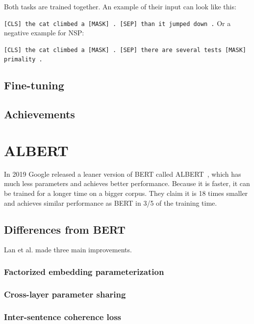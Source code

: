 \documentclass[
  digital, %
  table,   %
  twoside, %
  lof,     %
  lot,     %
]{fithesis3}
\begin{document}
\subsubsection{}

Both tasks are trained together. An example of their input can look like this:

\texttt{[CLS] the cat climbed a [MASK] . [SEP] than it jumped \newline down .}
\newline
Or a negative example for NSP:

\texttt{[CLS] the cat climbed a [MASK] . [SEP] there are several tests [MASK] primality .}


\subsection{Fine-tuning}

\subsection{Achievements}

\section{ALBERT}
In 2019 Google released a leaner version of BERT called ALBERT~\parencite{albert}, which has much less parameters and achieves better performance. Because it is faster, it can be trained for a longer time on a bigger corpus. They claim it is 18 times smaller and achieves similar performance as BERT in 3/5 of the training time.

\subsection{Differences from BERT}
Lan et al. made three main improvements.
\subsubsection{Factorized embedding parameterization}
\subsubsection{Cross-layer parameter sharing}
\subsubsection{Inter-sentence coherence loss}
\end{document}
